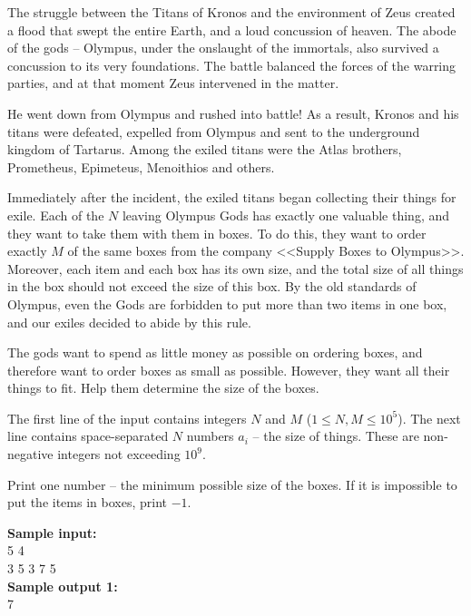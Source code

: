 \documentclass[a4paper]{article}
\begin{document}
The struggle between the Titans of Kronos and the environment of Zeus created a flood that swept the entire Earth, and a loud concussion of heaven. The abode of the gods -- Olympus, under the onslaught of the immortals, also survived a concussion to its very foundations. The battle balanced the forces of the warring parties, and at that moment Zeus intervened in the matter.

He went down from Olympus and rushed into battle! As a result, Kronos and his titans were defeated, expelled from Olympus and sent to the underground kingdom of Tartarus. Among the exiled titans were the Atlas brothers, Prometheus, Epimeteus, Menoithios and others.

Immediately after the incident, the exiled titans began collecting their things for exile. Each of the $N$ leaving Olympus Gods has exactly one valuable thing, and they want to take them with them in boxes. To do this, they want to order exactly $M$ of the same boxes from the company <<Supply Boxes to Olympus>>. Moreover, each item and each box has its own size, and the total size of all things in the box should not exceed the size of this box. By the old standards of Olympus, even the Gods are forbidden to put more than two items in one box, and our exiles decided to abide by this rule.

The gods want to spend as little money as possible on ordering boxes, and therefore want to order boxes as small as possible. However, they want all their things to fit. Help them determine the size of the boxes.

The first line of the input contains integers $N$ and $M$ ($1 \le N, M \le 10^5$). The next line contains space-separated $N$ numbers $a_i$ -- the size of things. These are non-negative integers not exceeding $10^9$.

Print one number -- the minimum possible size of the boxes. If it is impossible to put the items in boxes, print $-1$.

\LINE

\noindent \textbf{Sample input:}\\
5 4\\
3 5 3 7 5\\


\noindent \textbf{Sample output 1:}\\
7
\end{document}
